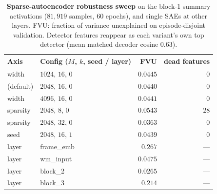 \documentclass[11pt]{article}
\begin{document}
\begin{table}[h]
\centering
\caption{\textbf{Sparse-autoencoder robustness sweep} on the block-1 summary activations ($81{,}919$ samples, 60 epochs), and single SAEs at other layers. FVU: fraction of variance unexplained on episode-disjoint validation. Detector features reappear as each variant's own top detector (mean matched decoder cosine $0.63$).}\label{stab:saegrid}
\begin{tabular}{@{}llrr@{}}
\toprule
Axis & Config ($M$, $k$, seed / layer) & FVU & dead features \\
\midrule
width      & $1024$, $16$, $0$  & $0.0445$ & $0$ \\
(default)  & $2048$, $16$, $0$  & $0.0440$ & $0$ \\
width      & $4096$, $16$, $0$  & $0.0441$ & $0$ \\
sparsity   & $2048$, $8$, $0$   & $0.0543$ & $28$ \\
sparsity   & $2048$, $32$, $0$  & $0.0363$ & $0$ \\
seed       & $2048$, $16$, $1$  & $0.0439$ & $0$ \\
\midrule
layer      & \textsf{frame\_emb} & $0.267$  & --- \\
layer      & \textsf{wm\_input}  & $0.0475$ & --- \\
layer      & \textsf{block\_2}   & $0.0265$ & --- \\
layer      & \textsf{block\_3}   & $0.214$  & --- \\
\bottomrule
\end{tabular}
\end{table}
\end{document}
